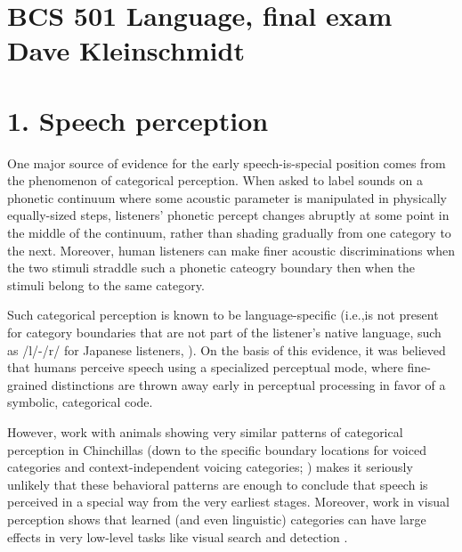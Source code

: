 \documentclass[11pt]{article}
\begin{document}
\section*{BCS 501 Language, final exam \\ Dave Kleinschmidt}

\section*{1. Speech perception}
\label{sec:1.-speech-perception}


One major source of evidence for the early speech-is-special position comes from the phenomenon of categorical perception.  When asked to label sounds on a phonetic continuum where some acoustic parameter is manipulated in physically equally-sized steps, listeners' phonetic percept changes abruptly at some point in the middle of the continuum, rather than shading gradually from one category to the next.  Moreover, human listeners can make finer acoustic discriminations when the two stimuli straddle such a phonetic cateogry boundary then when the stimuli belong to the same category.  

Such categorical perception is known to be language-specific (i.e.,is not present for category boundaries that are not part of the listener's native language, such as /l/-/r/ for Japanese listeners, ).  On the basis of this evidence, it was believed that humans perceive speech using a specialized perceptual mode, where fine-grained distinctions are thrown away early in perceptual processing in favor of a symbolic, categorical code.

However, work with animals showing very similar patterns of categorical perception in Chinchillas (down to the specific boundary locations for voiced categories and context-independent voicing categories; ) makes it seriously unlikely that these behavioral patterns are enough to conclude that speech is perceived in a special way from the very earliest stages.  Moreover, work in visual perception shows that learned (and even linguistic) categories can have large effects in very low-level tasks like visual search and detection \cite{Lupyan2010,Lupyan2008}.
\end{document}
